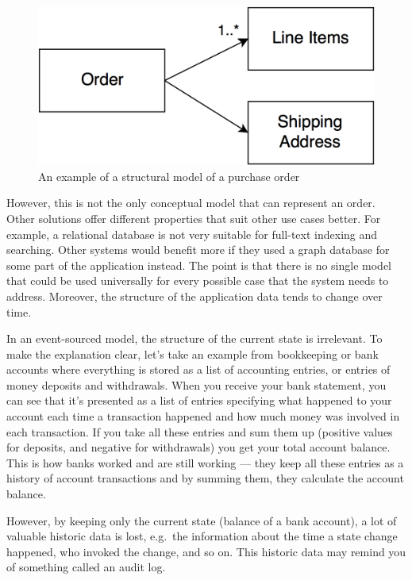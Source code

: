 \documentclass{book}
\begin{document}
\begin{figure}[h!]
\begin{center}
\includegraphics[width=0.7\columnwidth]{figures/relational-model/relational-model}
\caption{An example of a structural model of a purchase order%
}
\end{center}
\end{figure}

However, this is not the only conceptual model that can represent an
order. Other solutions offer different properties that suit other use
cases better. For example, a relational database is not very suitable
for full-text indexing and searching. Other systems would benefit more
if they used a graph database for some part of the application instead.
The point is that there is no single model that could be used
universally for every possible case that the system needs to address.
Moreover, the structure of the application data tends to change over
time.

In an event-sourced model, the structure of the current state is
irrelevant. To make the explanation clear, let's take an example from
bookkeeping or bank accounts where everything is stored as a list of
accounting entries, or entries of money deposits and withdrawals. When
you receive your bank statement, you can see that it's presented as a
list of entries specifying what happened to your account each time a
transaction happened and how much money was involved in each
transaction. If you take all these entries and sum them up (positive
values for deposits, and negative for withdrawals) you get your total
account balance. This is how banks worked and are still working --- they
keep all these entries as a history of account transactions and by
summing them, they calculate the account balance.

However, by keeping only the current state (balance of a bank account),
a lot of valuable historic data is lost, e.g.~the information about the
time a state change happened, who invoked the change, and so on. This
historic data may remind you of something called an audit log.
\end{document}
